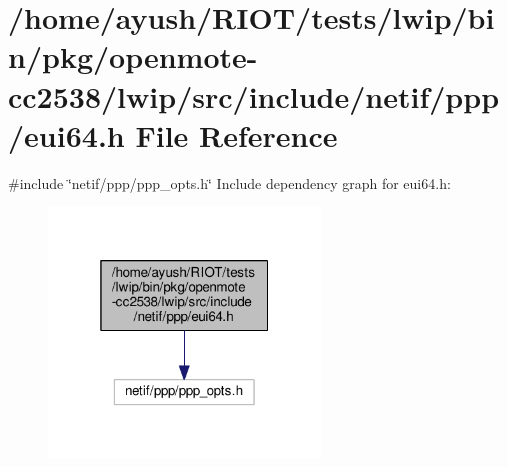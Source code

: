 \hypertarget{openmote-cc2538_2lwip_2src_2include_2netif_2ppp_2eui64_8h}{}\section{/home/ayush/\+R\+I\+O\+T/tests/lwip/bin/pkg/openmote-\/cc2538/lwip/src/include/netif/ppp/eui64.h File Reference}
\label{openmote-cc2538_2lwip_2src_2include_2netif_2ppp_2eui64_8h}
{\ttfamily \#include \char`\"{}netif/ppp/ppp\+\_\+opts.\+h\char`\"{}}\newline
Include dependency graph for eui64.\+h\+:
\nopagebreak
\begin{figure}[H]
\begin{center}
\leavevmode
\includegraphics[width=205pt]{openmote-cc2538_2lwip_2src_2include_2netif_2ppp_2eui64_8h__incl}
\end{center}
\end{figure}

